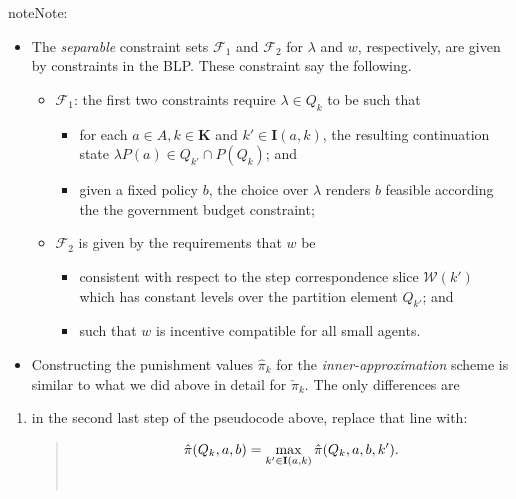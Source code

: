 \documentclass[a4paper,10pt,english]{sphinxmanual}
\begin{document}
\begin{notice}{note}{Note:}\begin{itemize}
\item {} 
The \emph{separable} constraint sets $\mathcal{F}_1$ and
$\mathcal{F}_2$ for $\lambda$ and $w$, respectively,
are given by constraints in the BLP. These constraint say the following.
\begin{itemize}
\item {} 
$\mathcal{F}_1$: the first two constraints require $\lambda \in Q_k$ to be such that
\begin{itemize}
\item {} 
for each $a \in A, k \in \mathbf{K}$ and $k' \in
\mathbf{I}(a,k)$, the resulting continuation state $\lambda P(a) \in Q_{k'} \cap P(Q_k)$; and

\item {} 
given a fixed policy $b$, the choice over $\lambda$
renders $b$ feasible according the the government budget
constraint;

\end{itemize}

\item {} 
$\mathcal{F}_2$ is given by the requirements that $w$ be
\begin{itemize}
\item {} 
consistent with respect to the step correspondence slice
$\mathcal{W}(k')$ which has constant levels over the partition
element $Q_{k'}$; and

\item {} 
such that $w$ is incentive compatible for all small
agents.

\end{itemize}

\end{itemize}

\item {} 
Constructing the punishment values $\hat{\pi}_k$ for the \emph{inner-approximation} scheme is similar to what we did above in detail for $\check{\pi}_k$. The only differences are

\end{itemize}
\begin{enumerate}
\item {} 
in the second last step of the pseudocode above, replace that line with:
\begin{quote}
\begin{gather}
\begin{split}\hat{\pi}(Q_k,a,b) = \max_{k' \in \mathbf{I}(a,k)} \hat{\pi}(Q_k,a,b,k').\end{split}\notag\\\begin{split}\end{split}\notag
\end{gather}\end{quote}


\end{enumerate}
\end{notice}
\end{document}
